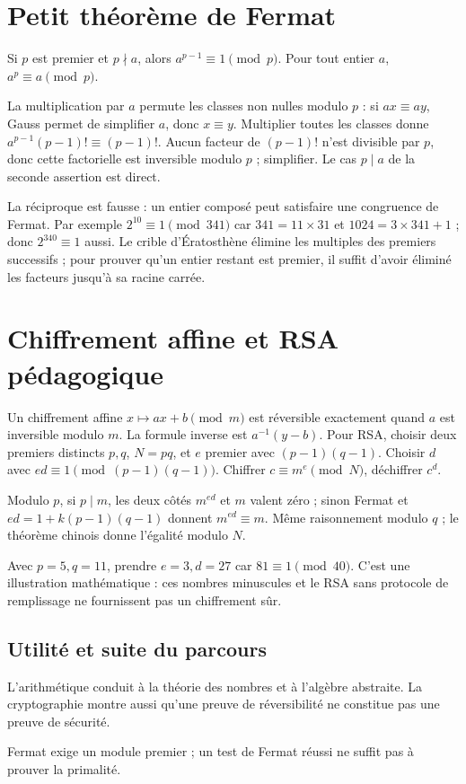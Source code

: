 \documentclass[../cours_tle.tex]{subfiles}
\begin{document}
\section{Petit théorème de Fermat}
\begin{theoreme}
Si $p$ est premier et $p\nmid a$, alors $a^{p-1}\equiv1\pmod p$. Pour tout entier $a$, $a^p\equiv a\pmod p$.
\end{theoreme}
\begin{demonstration}
La multiplication par $a$ permute les classes non nulles modulo $p$ : si $ax\equiv ay$, Gauss permet de simplifier $a$, donc $x\equiv y$.
Multiplier toutes les classes donne $a^{p-1}(p-1)!\equiv(p-1)!$.
Aucun facteur de $(p-1)!$ n'est divisible par $p$, donc cette factorielle est inversible modulo $p$ ; simplifier. Le cas $p\mid a$ de la seconde assertion est direct.
\end{demonstration}
La réciproque est fausse : un entier composé peut satisfaire une congruence de Fermat. Par exemple $2^{10}\equiv1\pmod{341}$ car $341=11\times31$ et $1024=3\times341+1$ ; donc $2^{340}\equiv1$ aussi.
Le crible d'Ératosthène élimine les multiples des premiers successifs ; pour prouver qu'un entier restant est premier, il suffit d'avoir éliminé les facteurs jusqu'à sa racine carrée.
\section{Chiffrement affine et RSA pédagogique}
Un chiffrement affine $x\mapsto ax+b\pmod m$ est réversible exactement quand $a$ est inversible modulo $m$. La formule inverse est $a^{-1}(y-b)$.
Pour RSA, choisir deux premiers distincts $p,q$, $N=pq$, et $e$ premier avec $(p-1)(q-1)$. Choisir $d$ avec $ed\equiv1\pmod{(p-1)(q-1)}$.
Chiffrer $c\equiv m^e\pmod N$, déchiffrer $c^d$.
\begin{demonstration}
Modulo $p$, si $p\mid m$, les deux côtés $m^{ed}$ et $m$ valent zéro ; sinon Fermat et $ed=1+k(p-1)(q-1)$ donnent $m^{ed}\equiv m$. Même raisonnement modulo $q$ ; le théorème chinois donne l'égalité modulo $N$.
\end{demonstration}
Avec $p=5,q=11$, prendre $e=3,d=27$ car $81\equiv1\pmod{40}$. C'est une illustration mathématique : ces nombres minuscules et le RSA sans protocole de remplissage ne fournissent pas un chiffrement sûr.
\begin{finchapitre}
\section{Utilité et suite du parcours}
L'arithmétique conduit à la théorie des nombres et à l'algèbre abstraite. La cryptographie montre aussi qu'une preuve de réversibilité ne constitue pas une preuve de sécurité.
\begin{retenir}
Fermat exige un module premier ; un test de Fermat réussi ne suffit pas à prouver la primalité.
\end{retenir}
\end{finchapitre}
\end{document}
